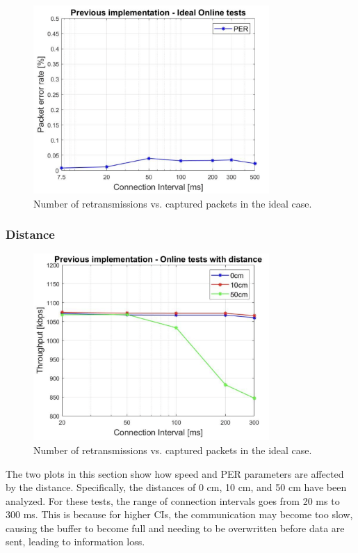 \documentclass{Configuration_Files/PoliMi3i_thesis}
\begin{document}
\begin{figure}[h!]
    \centering
    \includegraphics[width=0.8\textwidth]{Results Manuel/figure3}
    \caption{Number of retransmissions vs. captured packets in the ideal case.}
    \label{fig:figure1}
\end{figure}

\subsubsection*{Distance}

\begin{figure}[h!]
    \centering
    \includegraphics[width=0.8\textwidth]{Results Manuel/figure4}
    \caption{Number of retransmissions vs. captured packets in the ideal case.}
    \label{fig:figure1}
\end{figure}

The two plots in this section show how speed and PER parameters are affected by the distance. Specifically, the distances of 0 cm, 10 cm, and 50 cm have been analyzed. For these tests, the range of connection intervals goes from 20 ms to 300 ms. This is because for higher CIs, the communication may become too slow, causing the buffer to become full and needing to be overwritten before data are sent, leading to information loss.
\end{document}
